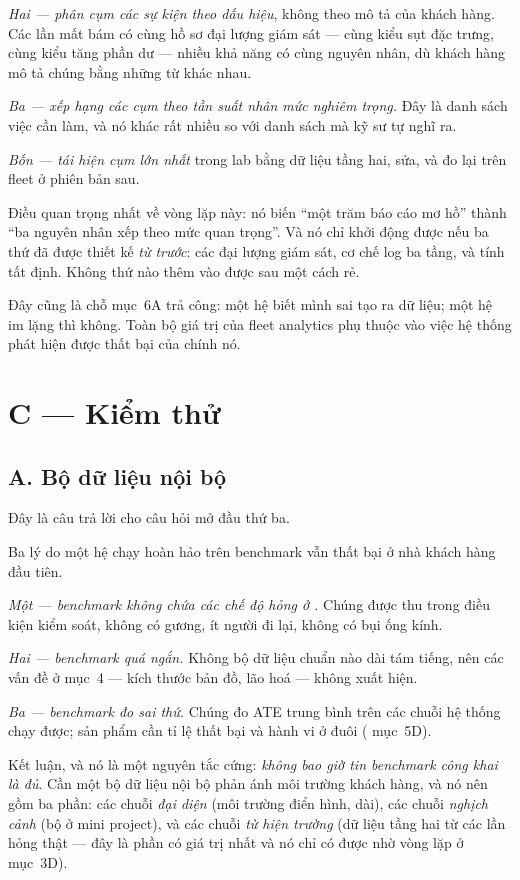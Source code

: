 \documentclass[../../vslam.tex]{subfiles}
\begin{document}
\emph{Hai --- phân cụm các sự kiện theo dấu hiệu}, không theo mô tả của khách hàng. Các lần mất bám có cùng hồ sơ đại lượng giám sát --- cùng kiểu sụt đặc trưng, cùng kiểu tăng phần dư --- nhiều khả năng có cùng nguyên nhân, dù khách hàng mô tả chúng bằng những từ khác nhau.

\emph{Ba --- xếp hạng các cụm theo tần suất nhân mức nghiêm trọng.} Đây là danh sách việc cần làm, và nó khác rất nhiều so với danh sách mà kỹ sư tự nghĩ ra.

\emph{Bốn --- tái hiện cụm lớn nhất} trong lab bằng dữ liệu tầng hai, sửa, và đo lại trên fleet ở phiên bản sau.

Điều quan trọng nhất về vòng lặp này: nó biến ``một trăm báo cáo mơ hồ'' thành ``ba nguyên nhân xếp theo mức quan trọng''. Và nó chỉ khởi động được nếu ba thứ đã được thiết kế \emph{từ trước}: các đại lượng giám sát, cơ chế log ba tầng, và tính tất định. Không thứ nào thêm vào được sau một cách rẻ.

Đây cũng là chỗ  mục~6A trả công: một hệ biết mình sai tạo ra dữ liệu; một hệ im lặng thì không. Toàn bộ giá trị của fleet analytics phụ thuộc vào việc hệ thống phát hiện được thất bại của chính nó.

\section{C --- Kiểm thử}

\subsection{A. Bộ dữ liệu nội bộ}

Đây là câu trả lời cho câu hỏi mở đầu thứ ba.

Ba lý do một hệ chạy hoàn hảo trên benchmark vẫn thất bại ở nhà khách hàng đầu tiên.

\emph{Một --- benchmark không chứa các chế độ hỏng ở .} Chúng được thu trong điều kiện kiểm soát, không có gương, ít người đi lại, không có bụi ống kính.

\emph{Hai --- benchmark quá ngắn.} Không bộ dữ liệu chuẩn nào dài tám tiếng, nên các vấn đề ở  mục~4 --- kích thước bản đồ, lão hoá --- không xuất hiện.

\emph{Ba --- benchmark đo sai thứ.} Chúng đo ATE trung bình trên các chuỗi hệ thống chạy được; sản phẩm cần tỉ lệ thất bại và hành vi ở đuôi ( mục~5D).

Kết luận, và nó là một nguyên tắc cứng: \emph{không bao giờ tin benchmark công khai là đủ}. Cần một bộ dữ liệu nội bộ phản ánh môi trường khách hàng, và nó nên gồm ba phần: các chuỗi \emph{đại diện} (môi trường điển hình, dài), các chuỗi \emph{nghịch cảnh} (bộ ở  mini project), và các chuỗi \emph{từ hiện trường} (dữ liệu tầng hai từ các lần hỏng thật --- đây là phần có giá trị nhất và nó chỉ có được nhờ vòng lặp ở mục~3D).
\end{document}
